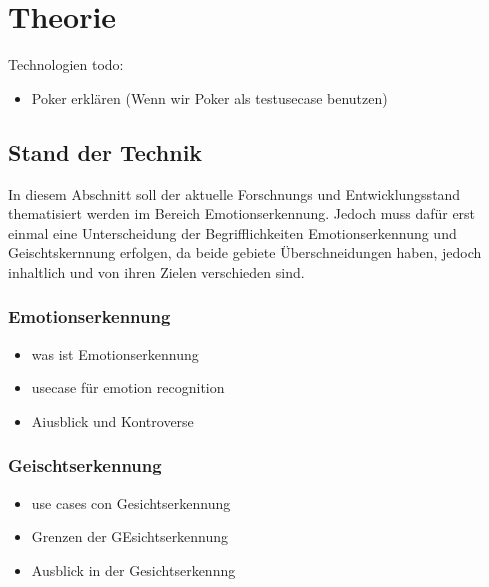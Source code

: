 \documentclass[12pt, a4paper]{scrbook}
\begin{document}
\let\cleardoublepage\relax
\chapter{Theorie}
Technologien todo:
\begin{itemize}

\item Poker erklären (Wenn wir Poker als testusecase benutzen)
\end{itemize}

\section{Stand der Technik}
In diesem Abschnitt soll der aktuelle Forschnungs und Entwicklungsstand thematisiert werden im Bereich Emotionserkennung. Jedoch muss dafür erst einmal eine Unterscheidung der Begrifflichkeiten
Emotionserkennung und Geischtskernnung erfolgen, da beide gebiete Überschneidungen haben, jedoch inhaltlich und von ihren Zielen verschieden sind.
\subsection{Emotionserkennung}

\begin{itemize}
\item was ist Emotionserkennung
\item usecase für emotion recognition
\item Aiusblick und Kontroverse
\end{itemize}


\subsection{Geischtserkennung}
\begin{itemize}
\item use cases con Gesichtserkennung
\item Grenzen der GEsichtserkennung
\item Ausblick in der Gesichtserkennng
\end{itemize}
\end{document}
